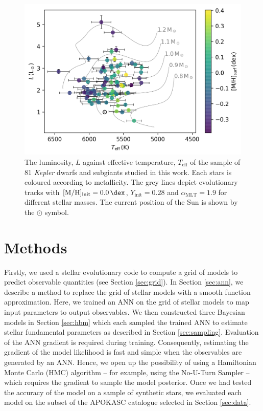 \documentclass[fleqn,usenatbib]{mnras}
\newcommand{\metallicity}{\ensuremath{[\mathrm{M}/\mathrm{H}]}}
\newcommand{\teff}{\ensuremath{T_\mathrm{eff}}}
\newcommand{\mlt}{\ensuremath{{\alpha_\mathrm{MLT}}}}
\begin{document}
\begin{figure}
    \centering
    \includegraphics[width=\linewidth]{figures/context.png}
    \caption{The luminosity, $L$ against effective temperature, $\teff$ of the sample of 81 \emph{Kepler} dwarfs and subgiants studied in this work. Each stars is coloured according to metallicity. The grey lines depict evolutionary tracks with $\metallicity_\mathrm{init}=\SI{0.0}{\dex}$, $Y_\mathrm{init}=0.28$ and $\mlt=1.9$ for different stellar masses. The current position of the Sun is shown by the $\odot$ symbol.}
    \label{fig:data}
\end{figure}

\section{Methods}\label{sec:meth}



Firstly, we used a stellar evolutionary code to compute a grid of models to predict observable quantities (see Section \ref{sec:grid}). In Section \ref{sec:ann}, we describe a method to replace the grid of stellar models with a smooth function approximation. Here, we trained an ANN on the grid of stellar models to map input parameters to output observables. We then constructed three Bayesian models in Section \ref{sec:hbm} which each sampled the trained ANN to estimate stellar fundamental parameters as described in Section \ref{sec:sampling}. Evaluation of the ANN gradient is required during training. Consequently, estimating the gradient of the model likelihood is fast and simple when the observables are generated by an ANN. Hence, we open up the possibility of using a Hamiltonian Monte Carlo (HMC) algorithm -- for example, using the No-U-Turn Sampler \citep[NUTS;][]{Hoffman.Gelman2014} -- which requires the gradient to sample the model posterior. Once we had tested the accuracy of the model on a sample of synthetic stars, we evaluated each model on the subset of the APOKASC catalogue selected in Section \ref{sec:data}.
\end{document}
